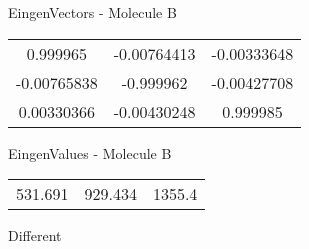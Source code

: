 \begin{multicols}{2}
\begin{center}
\vtab
 EingenVectors - Molecule B     \\
\vtab
\begin{tabular}{|c c c|}
0.999965	 & 	-0.00764413	 & 	-0.00333648	 \\
-0.00765838	 & 	-0.999962	 & 	-0.00427708	 \\
0.00330366	 & 	-0.00430248	 & 	0.999985
\end{tabular}

\vtab
 EingenValues - Molecule B     \\
\vtab
\begin{tabular}{|c c c|}
531.691	 & 	929.434	 & 	1355.4	 \\
\end{tabular}

\end{center}
\end{multicols}
\begin{center}
\vtab
\vtab
\textcolor{NavyBlue}{\Large Different}
\end{center}

 \newpage

